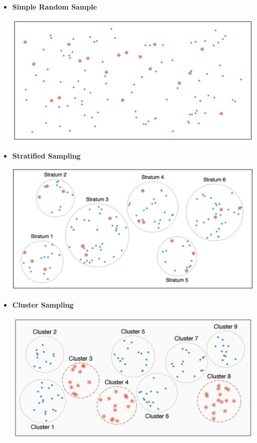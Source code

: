 \documentclass[11pt,letterpaper,twoside]{article}
\begin{document}
\begin{itemize}

\item {\bf Simple Random Sample} \vspace{60pt}

\begin{center}
\includegraphics[scale=0.7]{images/srs.png}
\end{center}

\item {\bf Stratified Sampling} \vspace{90pt}

\begin{center}
\includegraphics[scale=0.7]{images/stratified.png}
\end{center}

\newpage

\item {\bf Cluster Sampling} \vspace{90pt}

\begin{center}
\includegraphics[scale=0.7]{images/cluster.png}
\end{center}


\end{itemize}
\end{document}
